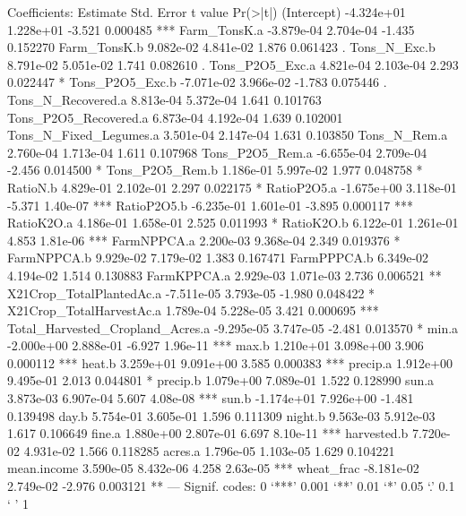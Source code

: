 \documentclass{report}
\begin{document}
\begin{Schunk}
\begin{Soutput}
Coefficients:
                                   Estimate Std. Error t value Pr(>|t|)    
(Intercept)                      -4.324e+01  1.228e+01  -3.521 0.000485 ***
Farm_TonsK.a                     -3.879e-04  2.704e-04  -1.435 0.152270    
Farm_TonsK.b                      9.082e-02  4.841e-02   1.876 0.061423 .  
Tons_N_Exc.b                      8.791e-02  5.051e-02   1.741 0.082610 .  
Tons_P2O5_Exc.a                   4.821e-04  2.103e-04   2.293 0.022447 *  
Tons_P2O5_Exc.b                  -7.071e-02  3.966e-02  -1.783 0.075446 .  
Tons_N_Recovered.a                8.813e-04  5.372e-04   1.641 0.101763    
Tons_P2O5_Recovered.a             6.873e-04  4.192e-04   1.639 0.102001    
Tons_N_Fixed_Legumes.a            3.501e-04  2.147e-04   1.631 0.103850    
Tons_N_Rem.a                      2.760e-04  1.713e-04   1.611 0.107968    
Tons_P2O5_Rem.a                  -6.655e-04  2.709e-04  -2.456 0.014500 *  
Tons_P2O5_Rem.b                   1.186e-01  5.997e-02   1.977 0.048758 *  
RatioN.b                          4.829e-01  2.102e-01   2.297 0.022175 *  
RatioP2O5.a                      -1.675e+00  3.118e-01  -5.371 1.40e-07 ***
RatioP2O5.b                      -6.235e-01  1.601e-01  -3.895 0.000117 ***
RatioK2O.a                        4.186e-01  1.658e-01   2.525 0.011993 *  
RatioK2O.b                        6.122e-01  1.261e-01   4.853 1.81e-06 ***
FarmNPPCA.a                       2.200e-03  9.368e-04   2.349 0.019376 *  
FarmNPPCA.b                       9.929e-02  7.179e-02   1.383 0.167471    
FarmPPPCA.b                       6.349e-02  4.194e-02   1.514 0.130883    
FarmKPPCA.a                       2.929e-03  1.071e-03   2.736 0.006521 ** 
X21Crop_TotalPlantedAc.a         -7.511e-05  3.793e-05  -1.980 0.048422 *  
X21Crop_TotalHarvestAc.a          1.789e-04  5.228e-05   3.421 0.000695 ***
Total_Harvested_Cropland_Acres.a -9.295e-05  3.747e-05  -2.481 0.013570 *  
min.a                            -2.000e+00  2.888e-01  -6.927 1.96e-11 ***
max.b                             1.210e+01  3.098e+00   3.906 0.000112 ***
heat.b                            3.259e+01  9.091e+00   3.585 0.000383 ***
precip.a                          1.912e+00  9.495e-01   2.013 0.044801 *  
precip.b                          1.079e+00  7.089e-01   1.522 0.128990    
sun.a                             3.873e-03  6.907e-04   5.607 4.08e-08 ***
sun.b                            -1.174e+01  7.926e+00  -1.481 0.139498    
day.b                             5.754e-01  3.605e-01   1.596 0.111309    
night.b                           9.563e-03  5.912e-03   1.617 0.106649    
fine.a                            1.880e+00  2.807e-01   6.697 8.10e-11 ***
harvested.b                       7.720e-02  4.931e-02   1.566 0.118285    
acres.a                           1.796e-05  1.103e-05   1.629 0.104221    
mean.income                       3.590e-05  8.432e-06   4.258 2.63e-05 ***
wheat_frac                       -8.181e-02  2.749e-02  -2.976 0.003121 ** 
---
Signif. codes:  0 ‘***’ 0.001 ‘**’ 0.01 ‘*’ 0.05 ‘.’ 0.1 ‘ ’ 1


\end{Soutput}
\end{Schunk}
\end{document}
